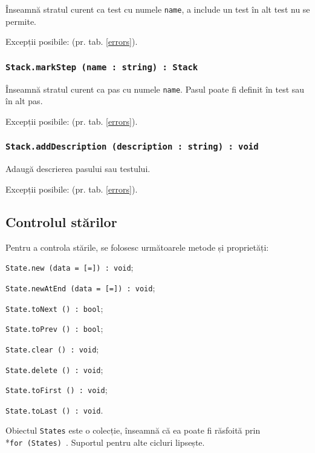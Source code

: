 Înseamnă stratul curent ca test cu numele \texttt{name}, a include un test în alt test nu se permite.

Excepții posibile:  (pr. tab. \ref{errors}).

\subsubsection{\texttt{Stack.markStep (name : string) : Stack}}

Înseamnă stratul curent ca pas cu numele \texttt{name}. Pasul poate fi definit în test sau în alt pas.

Excepții posibile:  (pr. tab. \ref{errors}).

\subsubsection{\texttt{Stack.addDescription (description : string) : void}}

Adaugă descrierea pasului sau testului.

Excepții posibile:  (pr. tab. \ref{errors}).

\subsection{Controlul stărilor}

Pentru a controla stările, se folosesc următoarele metode și proprietăți:
\begin{icItems}
	\item \texttt{State.new (data = [=]) : void};
	\item \texttt{State.newAtEnd (data = [=]) : void};
	\item \texttt{State.toNext () : bool};
	\item \texttt{State.toPrev () : bool};
	\item \texttt{State.clear () : void};
	\item \texttt{State.delete () : void};
	\item \texttt{State.toFirst () : void};
	\item \texttt{State.toLast () : void}.
\end{icItems}

Obiectul \texttt{States} este o colecție, înseamnă că ea poate fi răsfoită prin \\*\texttt{for (States) {}}. Suportul pentru alte cicluri lipsește.

